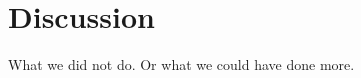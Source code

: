 \section{Discussion} %
\label{sec:discussion}

What we did not do. Or what we could have done more.

